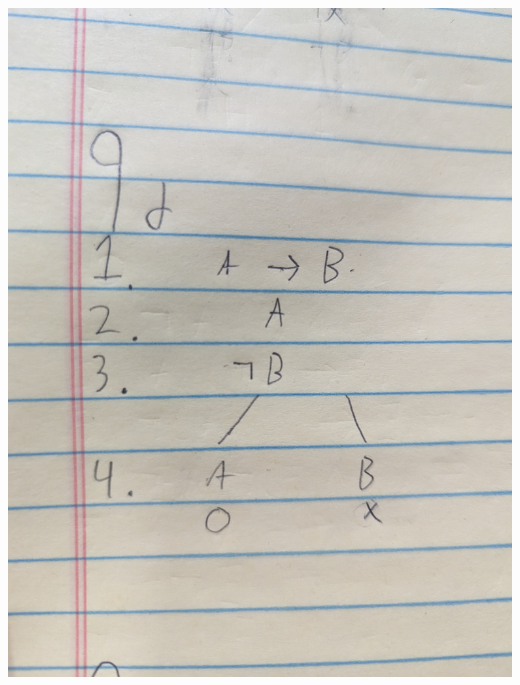 \documentclass[12pt]{article}
\begin{document}
\includegraphics[width=\textwidth]{9d}
\end{document}
